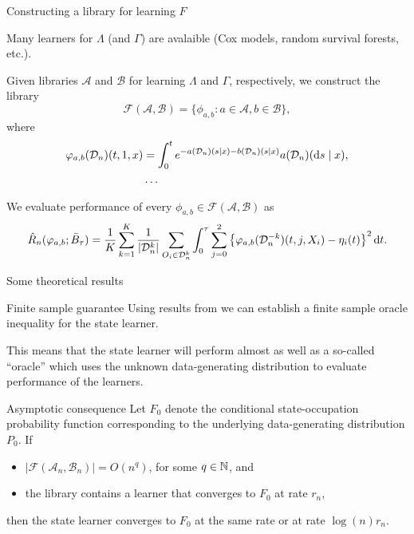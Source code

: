 \documentclass[smaller]{beamer}\usepackage{listings}
\begin{document}
\begin{frame}[label={sec:org9195dc2}]{Constructing a library for learning \(F\)}
\small

Many learners for \(\Lambda\) (and \(\Gamma\)) are avalaible (Cox models, random
survival forests, etc.).

\vfill

Given libraries \( \mathcal{A} \) and \( \mathcal{B} \) for learning $\Lambda$
and $\Gamma$, respectively,  we construct the library
\begin{equation*}
  \mathcal{F}(\mathcal{A}, \mathcal{B})
  = \{ \phi_{a, b} : a \in \mathcal{A}, b \in \mathcal{B}\},
\end{equation*}
where
\begin{align*}
  \varphi_{a, b}(\mathcal{D}_n)(t,1,x) &= \int_0^t e^{-a(\mathcal{D}_n)(s \mid
    x) -
    b(\mathcal{D}_n)(s \mid x) }  a(\mathcal{D}_n)(\mathop{}\!\mathrm{d} s \mid x),
  \\
  & \dots 
\end{align*}

We evaluate performance of every
\( \phi_{a, b} \in \mathcal{F}(\mathcal{A}, \mathcal{B}) \) as
\begin{equation*}
  \hat{R}_n(\varphi_{a, b}; \bar{B}_{\tau}) =
  \frac{1}{K}\sum_{k=1}^{K}
  \frac{1}{| \mathcal{D}_n^{k} |}\sum_{O_i \in \mathcal{D}_n^{k}}
  \int_0^{\tau} \sum_{j=0}^{2} 
  \left\{
    \varphi_{a, b}(\mathcal{D}_n^{-k})(t,j, X_i) - \eta_i(t)
  \right\}^2 \mathop{}\!\mathrm{d} t.
\end{equation*}
\end{frame}


\begin{frame}[label={sec:org78c70b6}]{Some theoretical results}
\small

\begin{block}{Finite sample guarantee}
Using results from \citep{van2003unicv,van2006oracle} we can establish a finite
sample oracle inequality for the state learner.

\hfill

This means that the state learner will perform almost as well as a so-called
``oracle'' which uses the unknown data-generating distribution to evaluate
performance of the learners.

\hfill
\end{block}

\begin{block}{Asymptotic consequence}
Let \(F_0\) denote the conditional state-occupation probability function
corresponding to the underlying data-generating distribution \(P_0\). If

\begin{itemize}
\item \(|\mathcal{F}(\mathcal{A}_n,\mathcal{B}_n)| = O(n^q)\), for some \(q \in
  \mathbb{N}\), and
\item the library contains a learner that converges to \(F_0\) at rate \(r_n\),
\end{itemize}

then the state learner converges to \(F_0\) at the same rate or at rate \(\log(n) r_n\).
\end{block}
\end{frame}
\end{document}
